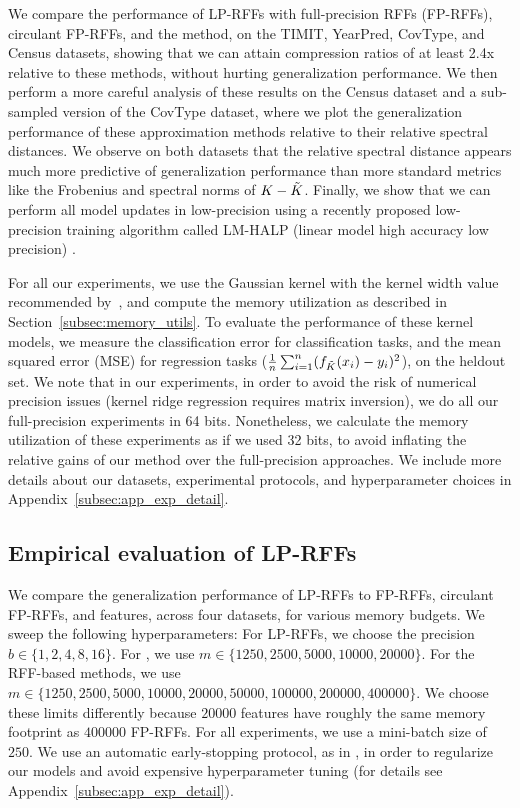 We compare the performance of LP-RFFs with full-precision RFFs (FP-RFFs), circulant FP-RFFs, and the \Nystrom method, on the TIMIT, YearPred, CovType, and Census datasets, showing that we can attain compression ratios of at least 2.4x relative to these methods, without hurting generalization performance. We then perform a more careful analysis of these results on the Census dataset and a sub-sampled version of the CovType dataset, where we plot the generalization performance of these approximation methods relative to their relative spectral distances. We observe on both datasets that the relative spectral distance appears much more predictive of generalization performance than more standard metrics like the Frobenius and spectral norms of $K-\tilde{K}$. Finally, we show that we can perform all model updates in low-precision using a recently proposed low-precision training algorithm called LM-HALP (linear model high accuracy low precision) \citep{halp18}.

For all our experiments, we use the Gaussian kernel with the kernel width value recommended by~\citet{may2017}, and compute the memory utilization as described in Section~\ref{subsec:memory_utils}. To evaluate the performance of these kernel models, we measure the classification error for classification tasks, and the mean squared error (MSE) for regression tasks ($\frac{1}{n}\sum_{i=1}^n (f_{\tilde{K}}(x_i) - y_i)^2$), on the heldout set. We note that in our experiments, in order to avoid the risk of numerical precision issues (kernel ridge regression requires matrix inversion), we do all our full-precision experiments in 64 bits.  Nonetheless, we calculate the memory utilization of these experiments as if we used 32 bits, to avoid inflating the relative gains of our method over the full-precision approaches.  We include more details about our datasets, experimental protocols, and hyperparameter choices in Appendix~\ref{subsec:app_exp_detail}.\vsp

\subsection{Empirical evaluation of LP-RFFs}
\label{sec:full_run}
We compare the generalization performance of LP-RFFs to FP-RFFs, circulant FP-RFFs, and \Nystrom features, across four datasets, for various memory budgets.  We sweep the following hyperparameters: For LP-RFFs, we choose the precision $b \in \{1,2,4,8,16\}$. For \NystromNS, we use $m \in \{1250, 2500, 5000, 10000, 20000\}$.  For the RFF-based methods, we use $m\in \{1250, 2500, 5000, 10000, 20000, 50000, 100000, 200000, 400000\}$. We choose these limits differently because $\num[group-separator={,}]{20000}$ \Nystrom features have roughly the same memory footprint as $\num[group-separator={,}]{400000}$ FP-RFFs. For all experiments, we use a mini-batch size of $250$.  We use an automatic early-stopping protocol, as in \citep{morgan1990generalization,sainath2013b,sainath2013low}, in order to regularize our models \citep{zhang2005boosting,wei2017early} and avoid expensive hyperparameter tuning (for details see Appendix~\ref{subsec:app_exp_detail}).

